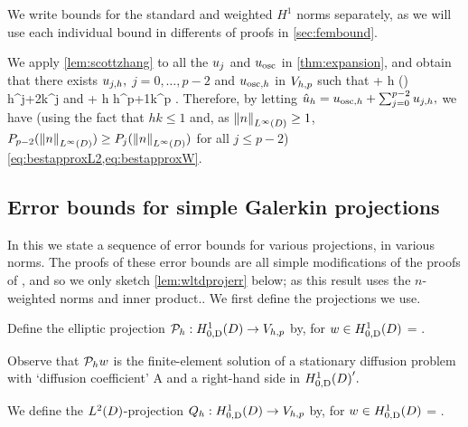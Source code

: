 We write bounds for the standard and weighted $H^1$ norms separately, as we will use each individual bound in differents of proofs in \cref{sec:fembound}.

We apply \cref{lem:scottzhang} to all the $u_{j}$ and $u_{\mathrm{osc}}$ in \cref{thm:expansion}, and obtain that there exists $u_{j,h},$ $j=0,\ldots,p-2$ and $u_{\mathrm{osc},h}$ in $V_{h,p}$ such that 
\beqs
\NLtD{\usj - \ujh} + h\NHoD{\usj - \ujh} \leq {}  \Pj\mleft(\mright) h^{j+2}k^j \Cfg
\eeqs
and
\beqs
\NLtD{\uosc - \uosch} + h\NHoD{\uosc - \uosch} \leq {} \Cosc\CAnk h^{p+1}k^p \Cfg.
\eeqs
Therefore, by letting $\hat{u}_{h} = u_{\mathrm{osc},h} + \sum_{j=0}^{p-2} u_{j,h},$ we have (using the fact that $hk \leq 1$ and, as $\NLiD{n} \geq 1$, $\Pfn{p-2}(\NLiD{n}) \geq \Pfn{j}(\NLiD{n})$ for all $j \leq p-2$) \cref{eq:bestapproxL2,eq:bestapproxW}.
\epf

\subsection{Error bounds for simple Galerkin projections}\label{sec:errgalerkin}
In this  we state a sequence of error bounds for various projections, in various norms. The proofs of these error bounds are all simple modifications of the proofs of \cite[Theorem 5.8.3]{BrSc:08},  and so we only sketch \cref{lem:wltdprojerr} below; as this result uses the $n$-weighted norms and inner product.. %
We first define the projections we use.

Define the elliptic projection $\Ph:\HozDD\rightarrow\Vhp$ by, for $w \in \HozDD$
\beqs
{} =  \tforall \vh \in \Vhp.
\eeqs

Observe that $\mathcal P_{h} w$ is the finite-element solution of a stationary diffusion problem with `diffusion coefficient' A and a right-hand side in $\HozDD'.$

We define the $\LtD$-projection $\Qh:\HozDD\rightarrow \Vhp$ by, for $w \in \HozDD$
\beqs
{} =  \tforall \vh \in \Vhp.
\eeqs

